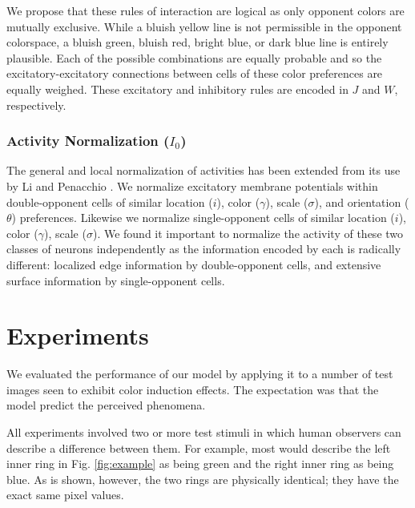 \documentclass[journal,onecolumn]{IEEEtran}
\begin{document}
We propose that these rules of interaction are logical as only opponent colors are mutually exclusive. While a bluish yellow line is not permissible in the opponent colorspace, a bluish green, bluish red, bright blue, or dark blue line is entirely plausible. Each of the possible combinations are equally probable and so the excitatory-excitatory connections between cells of these color preferences are equally weighed. These excitatory and inhibitory rules are encoded in $J$ and $W$, respectively.

\subsubsection*{Activity Normalization ($I_0$)}
The general and local normalization of activities \cite{heeger:1993} has been extended from its use by Li \cite{li:1999} and Penacchio \cite{penacchio:2013}. We normalize excitatory membrane potentials within double-opponent cells of similar location ($i$), color ($\gamma$), scale ($\sigma$), and orientation ($\theta$) preferences. Likewise we normalize single-opponent cells of similar location ($i$), color ($\gamma$), scale ($\sigma$). We found it important to normalize the activity of these two classes of neurons independently as the information encoded by each is radically different: localized edge information by double-opponent cells, and extensive surface information by single-opponent cells.

%
%
%
\section{Experiments}

We evaluated the performance of our model by applying it to a number of test images seen to exhibit color induction effects. The expectation was that the model predict the perceived phenomena.

All experiments involved two or more test stimuli in which human observers can describe a difference between them. For example, most would describe the left inner ring in Fig. \ref{fig:example} as being green and the right inner ring as being blue. As is shown, however, the two rings are physically identical; they have the exact same pixel values.
\end{document}
